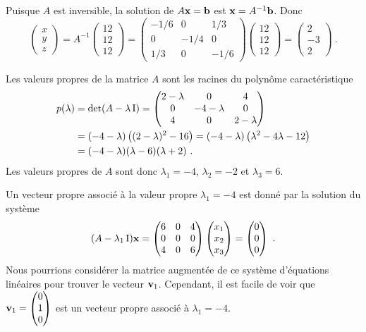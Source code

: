 { Puisque $A$ est inversible, la solution de $A\mathbf{x} =
\mathbf{b}$ est $\mathbf{x} = A^{-1}\mathbf{b}$.  Donc
\[
\begin{pmatrix} x \\ y \\ z \end{pmatrix}
= A^{-1}\begin{pmatrix} 12 \\ 12 \\ 12 \end{pmatrix}
= \begin{pmatrix}
-1/6 & 0 & 1/3 \\
0 & -1/4 & 0 \\
1/3 & 0 & -1/6 
\end{pmatrix}\begin{pmatrix} 12 \\ 12 \\ 12 \end{pmatrix}
= \begin{pmatrix}  2 \\ -3 \\ 2 \end{pmatrix} \ . 
\]

Les valeurs propres de la matrice $A$ sont les racines du polynôme
caractéristique
\begin{align*}
p(\lambda) &= \det(A-\lambda \operatorname{I})=
\begin{pmatrix}
2-\lambda & 0 & 4 \\
0 & -4-\lambda & 0 \\
4 & 0 & 2-\lambda
\end{pmatrix} \\
&= (-4-\lambda)\left( (2-\lambda)^2 - 16 \right)
= (-4-\lambda)\left( \lambda^2 - 4 \lambda -12 \right) \\
&= (-4-\lambda)(\lambda - 6)(\lambda +2) \ .
\end{align*}
Les valeurs propres de $A$ sont donc $\lambda_1 = -4$, $\lambda_2 = -2$
et $\lambda_3 = 6$.

 Un vecteur propre
associé à la valeur propre $\lambda_1 = -4$ est donné par la solution
du système
\[
(A-\lambda_1\operatorname{I})\mathbf{x} = 
\begin{pmatrix}
6 & 0 & 4 \\0 & 0 & 0 \\4 & 0 & 6
\end{pmatrix}
\begin{pmatrix} x_1 \\ x_2 \\ x_3 \end{pmatrix}
= \begin{pmatrix} 0 \\ 0 \\ 0 \end{pmatrix} \ .
\]
Nous pourrions considérer la matrice augmentée de ce système d'équations
linéaires pour trouver le vecteur $\mathbf{v}_1$.  Cependant, il est
facile de voir que 
$\displaystyle \mathbf{v}_1 = \begin{pmatrix} 0 \\ 1 \\ 0 \end{pmatrix}$
est un vecteur propre associé à $\lambda_1 = -4$.

}
